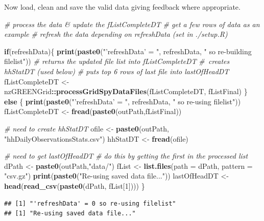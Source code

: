 \documentclass[]{article}
\newenvironment{Shaded}{\begin{snugshade}}{\end{snugshade}}
\newcommand{\KeywordTok}[1]{\textcolor[rgb]{0.13,0.29,0.53}{\textbf{#1}}}
\newcommand{\DataTypeTok}[1]{\textcolor[rgb]{0.13,0.29,0.53}{#1}}
\newcommand{\DecValTok}[1]{\textcolor[rgb]{0.00,0.00,0.81}{#1}}
\newcommand{\StringTok}[1]{\textcolor[rgb]{0.31,0.60,0.02}{#1}}
\newcommand{\CommentTok}[1]{\textcolor[rgb]{0.56,0.35,0.01}{\textit{#1}}}
\newcommand{\ControlFlowTok}[1]{\textcolor[rgb]{0.13,0.29,0.53}{\textbf{#1}}}
\newcommand{\OperatorTok}[1]{\textcolor[rgb]{0.81,0.36,0.00}{\textbf{#1}}}
\newcommand{\NormalTok}[1]{#1}
\begin{document}
Now load, clean and save the valid data giving feedback where
appropriate.

\begin{Shaded}
\begin{Highlighting}[]
\CommentTok{# process the data & update the fListCompleteDT}
\CommentTok{# get a few rows of data as an example}
\CommentTok{# refresh the data depending on refreshData (set in ./setup.R)}

\ControlFlowTok{if}\NormalTok{(refreshData)\{}
  \KeywordTok{print}\NormalTok{(}\KeywordTok{paste0}\NormalTok{(}\StringTok{"'refreshData' = "}\NormalTok{, refreshData, }\StringTok{" so re-building filelist"}\NormalTok{))}
  \CommentTok{# returns the updated file list into fListCompleteDT}
  \CommentTok{# creates hhStatDT (used below)}
  \CommentTok{# puts top 6 rows of last file into lastOfHeadDT}
\NormalTok{  fListCompleteDT <-}\StringTok{ }\NormalTok{nzGREENGrid}\OperatorTok{::}\KeywordTok{processGridSpyDataFiles}\NormalTok{(fListCompleteDT, fListFinal)}
\NormalTok{\} }\ControlFlowTok{else}\NormalTok{ \{}
  \KeywordTok{print}\NormalTok{(}\KeywordTok{paste0}\NormalTok{(}\StringTok{"'refreshData' = "}\NormalTok{, refreshData, }\StringTok{" so re-using filelist"}\NormalTok{))}
\NormalTok{  fListCompleteDT <-}\StringTok{ }\KeywordTok{fread}\NormalTok{(}\KeywordTok{paste0}\NormalTok{(outPath,fListFinal))}
  
  \CommentTok{# need to create hhStatDT}
\NormalTok{  ofile <-}\StringTok{ }\KeywordTok{paste0}\NormalTok{(outPath, }\StringTok{"hhDailyObservationsStats.csv"}\NormalTok{)}
\NormalTok{  hhStatDT <-}\StringTok{ }\KeywordTok{fread}\NormalTok{(ofile)}
  
  \CommentTok{# need to get lastOfHeadDT}
  \CommentTok{# do this by getting the first in the processed list}
\NormalTok{  dPath <-}\StringTok{ }\KeywordTok{paste0}\NormalTok{(outPath,}\StringTok{"data/"}\NormalTok{)}
\NormalTok{  fList <-}\StringTok{ }\KeywordTok{list.files}\NormalTok{(}\DataTypeTok{path =}\NormalTok{ dPath, }\DataTypeTok{pattern =} \StringTok{"csv.gz"}\NormalTok{)}
  \KeywordTok{print}\NormalTok{(}\KeywordTok{paste0}\NormalTok{(}\StringTok{"Re-using saved data file..."}\NormalTok{))}
\NormalTok{  lastOfHeadDT <-}\StringTok{ }\KeywordTok{head}\NormalTok{(}\KeywordTok{read_csv}\NormalTok{(}\KeywordTok{paste0}\NormalTok{(dPath, fList[}\DecValTok{1}\NormalTok{])))}
\NormalTok{\}}
\end{Highlighting}
\end{Shaded}

\begin{verbatim}
## [1] "'refreshData' = 0 so re-using filelist"
## [1] "Re-using saved data file..."
\end{verbatim}
\end{document}
